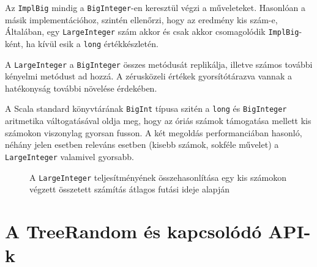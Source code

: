 \documentclass[
    parspace,
    noindent,
    nohyp,
]{elteiktdk}[2023/04/10]
\begin{document}
Az \texttt{ImplBig} mindig a \texttt{BigInteger}-en keresztül végzi a műveleteket.
Hasonlóan a másik implementációhoz, szintén ellenőrzi, hogy az eredmény kis szám-e,
Általában, egy \texttt{LargeInteger} szám akkor és csak akkor csomagolódik \texttt{ImplBig}-ként,
ha kívül esik a \texttt{long} értékkészletén.

A \texttt{LargeInteger} a \texttt{BigInteger} összes metódusát replikálja,
illetve számos további kényelmi metódust ad hozzá.
A zérusközeli értékek gyorsítótárazva vannak a hatékonyság további növelése érdekében.

A Scala standard könyvtárának \texttt{BigInt} típusa szitén a \texttt{long} és \texttt{BigInteger}
aritmetika váltogatásával oldja meg,
hogy az óriás számok támogatása mellett kis számokon viszonylag gyorsan fusson.
A két megoldás performanciában hasonló,
néhány jelen esetben releváns esetben (kisebb számok, sokféle művelet)
a \texttt{LargeInteger} valamivel gyorsabb.

\begin{figure}[H]
    \centering
    \caption{
        A \texttt{LargeInteger} teljesítményének összehasonlítása
        egy kis számokon végzett összetett számítás átlagos futási ideje alapján
    }
\end{figure}


\section{A TreeRandom és kapcsolódó API-k}
\end{document}
